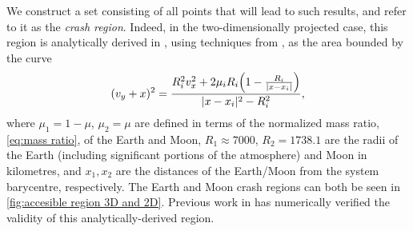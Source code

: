     



    We construct a set consisting of all points that will lead to such results, and refer to it as the \textit{crash region}.
%
    Indeed, in the two-dimensionally projected case, this region is analytically derived in \cite{Graebner2025}, using techniques from \cite{Abraham_Marsden_1987}, as the area bounded by the curve
    \vspace{-0cm}
    \begin{equation} \label{eq:crashRegion}
    	(v_y + x)^2 =  \frac{R_i^2 v_x^2 + 2 \mu_i R_i \Bigl( 1 - \frac{R_i}{|x-x_i|}\Bigr)}{|x-x_i|^2 - R_i^2},
    \end{equation}
     where $\mu_1 = 1-\mu$, $\mu_2 = \mu$ are defined in terms of the normalized mass ratio, \cref{eq:mass ratio}, of the Earth and Moon, $R_1 \approx 7000$, $R_2 = 1738.1$ are the radii of the Earth (including significant portions of the atmosphere) and Moon in kilometres, and $x_1, x_2$ are the distances of the Earth/Moon from the system barycentre, respectively. The Earth and Moon crash regions can both be seen in \cref{fig:accesible region 3D and 2D}. Previous work in \cite{Graebner2025} has numerically verified the validity of this analytically-derived region.
    













